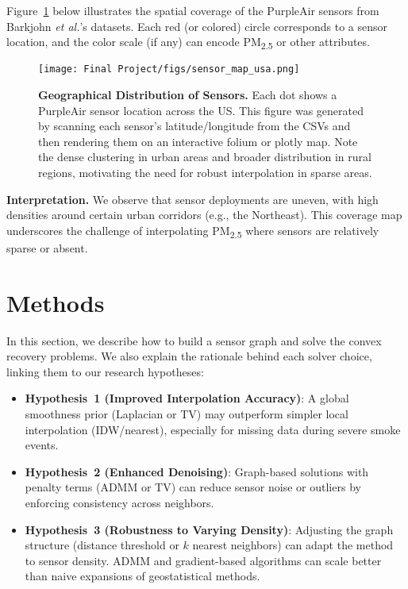 \documentclass[12pt]{article}                                %
\begin{document}
Figure~\ref{fig:coverageMap} below illustrates the spatial coverage of the PurpleAir sensors from Barkjohn \emph{et al.}'s datasets. Each red (or colored) circle corresponds to a sensor location, and the color scale (if any) can encode PM\textsubscript{2.5} or other attributes. 

\begin{figure}[H]   %
    \centering
    \texttt{[image: Final Project/figs/sensor\_map\_usa.png]}
    \caption{\textbf{Geographical Distribution of Sensors.} Each dot shows a PurpleAir sensor location across the US. 
    This figure was generated by scanning each sensor's latitude/longitude from the CSVs and then rendering them on an interactive folium or plotly map. Note the dense clustering in urban areas and broader distribution in rural regions, motivating the need for robust interpolation in sparse areas.}
    \label{fig:coverageMap}
\end{figure}

\noindent
\textbf{Interpretation.} 
We observe that sensor deployments are uneven, with high densities around certain urban corridors (e.g., the Northeast). This coverage map underscores the challenge of interpolating PM\textsubscript{2.5} where sensors are relatively sparse or absent.

\section{Methods}
\label{sec:methods}    %

In this section, we describe how to build a sensor graph and solve the convex recovery problems. 
We also explain the rationale behind each solver choice, linking them to our research hypotheses:

\begin{itemize}
    \item \textbf{Hypothesis~1 (Improved Interpolation Accuracy)}: A global smoothness prior 
    (Laplacian or TV) may outperform simpler local interpolation (IDW/nearest), especially for 
    missing data during severe smoke events.
    \item \textbf{Hypothesis~2 (Enhanced Denoising)}: Graph-based solutions with penalty terms 
    (ADMM or TV) can reduce sensor noise or outliers by enforcing consistency across neighbors.
    \item \textbf{Hypothesis~3 (Robustness to Varying Density)}: Adjusting the graph structure 
    (distance threshold or $k$ nearest neighbors) can adapt the method to sensor density. 
    ADMM and gradient-based algorithms can scale better than naive expansions of geostatistical methods.
\end{itemize}
\end{document}
